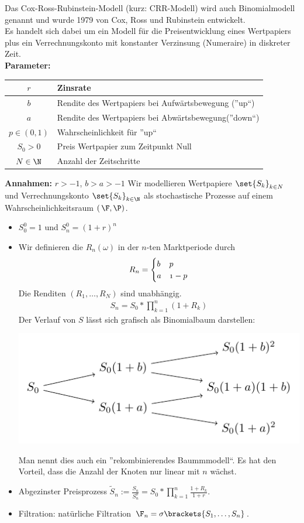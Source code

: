 Das Cox-Ross-Rubinstein-Modell (kurz: CRR-Modell) wird auch Binomialmodell genannt und wurde 1979 von Cox, Ross und Rubinstein entwickelt.\\
Es handelt sich dabei um ein Modell für die Preisentwicklung eines Wertpapiers plus ein Verrechnungskonto mit konstanter Verzinsung (Numeraire) in diskreter Zeit.\\
\textbf{Parameter:}

\begin{center}
	\begin{tabular}{|c|l|}
		\hline
		$r$ & Zinsrate \\ \hline
		$b$ & Rendite des Wertpapiers bei Aufwärtsbewegung (''up``) \\ \hline
		$a$ & Rendite des Wertpapiers bei Abwärtsbewegung(''down``) \\ \hline
		$p \in (0,1)$ & Wahrscheinlichkeit für ''up`` \\ \hline
		$S_0 > 0$ & Preis Wertpapier zum Zeitpunkt Null \\ \hline
		$N \in \N$ & Anzahl der Zeitschritte \\ \hline
	\end{tabular}
\end{center}
\textbf{Annahmen:} $r > -1$, $b > a > -1$
Wir modellieren Wertpapiere $\set{S_k}_{k \in N}$ und Verrechnungskonto $\set{S_k}_{k \in \N}$ als stochastische Prozesse auf einem Wahrscheinlichkeitsraum $(\, \F, \P)$.

\begin{itemize}
	\item $S_0^0 = 1$ und $S_n^0 = (1+r)^n$
	\item Wir definieren die  $R_n(\omega)$ in der $n$-ten Marktperiode durch
	\begin{align*}
	R_n = \begin{cases} b & \mit p \\ a & \mit 1-p \end{cases}
	\end{align*}
	Die Renditen $(R_1, \dots, R_N)$ sind unabhängig.
	\begin{align*}
	S_n = S_0 * \prod_{k=1}^n (1+R_k)
	\end{align*}
	Der Verlauf von $S$ lässt sich grafisch als Binomialbaum darstellen:
	\begin{center}
		\includegraphics[width=.5\textwidth]{tikz/stochv_1_2_crr.pdf}
	\end{center}
	Man nennt dies auch ein ''rekombinierendes Baummmodell``. Es hat den Vorteil, dass die Anzahl der Knoten nur linear mit $n$ wächst.
	\item Abgezinster Preisprozess $\tilde{S}_n := \frac{S_n}{S_n^0} = S_0 * \prod_{k=1}^n \frac{1+R_k}{1+r}$.
	\item Filtration: natürliche Filtration $\F_n = \sigma \brackets{S_1, \dots, S_n}$.
\end{itemize}

